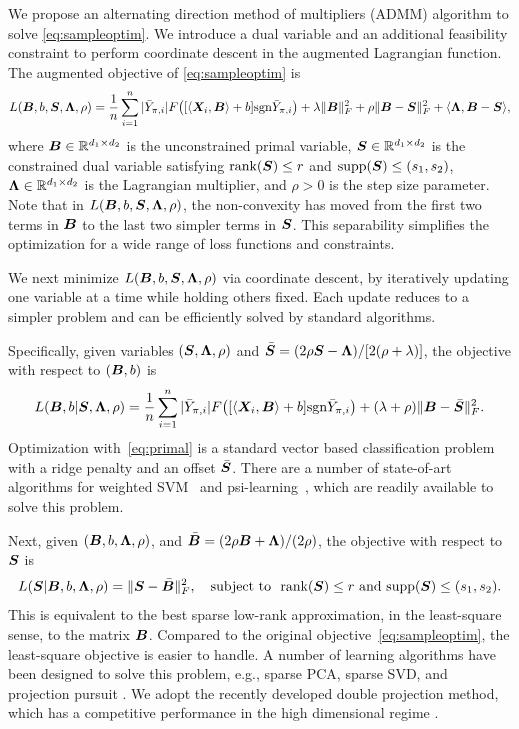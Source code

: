 \documentclass[11pt]{article}
\theoremstyle{plain}
\theoremstyle{definition}
\def\sign{\textup{sgn}}
\def\rank{\textup{rank}}
\begin{document}
We propose an alternating direction method of multipliers (ADMM) algorithm to solve \eqref{eq:sampleoptim}. We introduce a dual variable and an additional feasibility constraint to perform coordinate descent in the augmented Lagrangian function. The augmented objective of \eqref{eq:sampleoptim} is
\begin{equation*} \label{eq:ADMM}
L(\mB,b, \mS,\mLambda,\rho) = {1\over n}\sum_{i=1}^n|\bar Y_{\pi, i}|F\big([\langle \mX_i,\mB \rangle+b]\sign \bar Y_{\pi, i}\big)  + \lambda\FnormSize{}{\mB}^2+\rho\FnormSize{}{\mB-\mS}^2+\langle \mLambda, \mB-\mS\rangle,
\end{equation*}
where $\bm B\in \mathbb{R}^{d_1\times d_2}$ is the unconstrained primal variable, $\bm S\in\mathbb{R}^{d_1\times d_2}$ is the constrained dual variable satisfying $\rank(\mS)\leq r$ and $\text{supp}(\bm S)\leq (s_1,s_2)$, $\bm{\Lambda}\in\mathbb{R}^{d_1\times d_2}$ is the Lagrangian multiplier, and $\rho>0$ is the step size parameter. Note that in $L(\bm B,b, \bm S,\bm{\Lambda},\rho)$, the non-convexity has moved from the first two terms in $\bm B$ to the last two simpler terms in $\bm S$. This separability simplifies the optimization for a wide range of loss functions and constraints. 

We next minimize $L(\bm B,b, \bm S,\bm{\Lambda},\rho)$ via coordinate descent, by iteratively updating one variable at a time while holding others fixed. Each update reduces to a simpler problem and can be efficiently solved by standard algorithms. 

Specifically, given variables $(\bm S,\bm{\Lambda},\rho)$ and $\bar {\bm S} = (2\rho\bm S-\bm{\Lambda}) / [2(\rho+\lambda)]$, the objective with respect to $(\bm B,b)$ is 
\begin{equation*} \label{eq:primal}
L(\mB,b|\mS,\mLambda,\rho)={1\over n}\sum_{i=1}^n |\bar Y_{\pi, i}| F\big ([\langle \mX_i,\mB \rangle+b]\sign \bar Y_{\pi, i}\big) +(\lambda+\rho)\FnormSize{}{\mB-\bar \mS}^2.
\end{equation*}
Optimization with~\eqref{eq:primal} is a standard vector based classification problem with a ridge penalty and an offset $\bar {\bm S}$. There are a number of state-of-art algorithms for weighted SVM~\citep{wang2008probability} and psi-learning~\citep{shen2003psi}, which are readily available to solve this problem.  

Next, given $(\bm B,b,\bm{\Lambda},\rho)$, and $\bar {\bm B}=(2\rho\bm B+\bm{\Lambda}) / (2\rho)$, the objective with respect to $\bm S$ is
\begin{equation}\label{eq:dual}
L(\mS|\mB,b,\mLambda,\rho)=\FnormSize{}{\mS-\bar \mB}^2,\quad \text{subject to} ~~ \rank(\mS)\leq r \text{ and }\text{supp}(\mS)\leq (s_1,s_2).
\end{equation}
This is equivalent to the best sparse low-rank approximation, in the least-square sense, to the matrix $\bm B$. Compared to the original objective~\eqref{eq:sampleoptim}, the least-square objective is easier to handle. A number of learning algorithms have been designed to solve this problem, e.g., sparse PCA, sparse SVD, and projection pursuit \citep{Ma2013}. We adopt the recently developed double projection method, which has a competitive performance in the high dimensional regime \citep{Ma2016}. 
\end{document}
